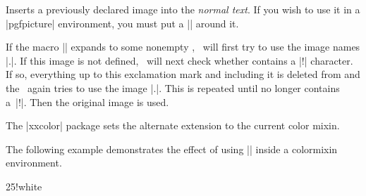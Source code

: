 \begin{command}{\pgfuseimage{}}
  Inserts a previously declared image into the \emph{normal text}. If
  you wish to use it in a |{pgfpicture}| environment, you must put a
  |\pgftext| around it.

  If the macro |\pgfalternateextension| expands to some nonempty
  , \pgfname\ will first try to use the image
  names |.|. If this
  image is not defined, \pgfname\ will next check whether  contains a |!| character. If so, everything up to this
  exclamation mark and including it is deleted from  and the \pgfname\ again tries to use the image |.|. This is repeated until
   no longer contains a~|!|. Then the
  original image is used.

  The |xxcolor| package sets the alternate extension to the current
  color mixin.          %

\begin{codeexample}[]
\begin{pgfpicture}

  \pgfpathrectangle{\pgfpoint{1cm}{5cm}}{\pgfpoint{1cm}{1cm}}
  \pgfpathrectangle{\pgfpoint{1cm}{3cm}}{\pgfpoint{1cm}{1cm}}
  \pgfpathrectangle{\pgfpoint{1cm}{1cm}}{\pgfpoint{1cm}{1cm}}
\end{pgfpicture}
\end{codeexample}

  The following example demonstrates the effect of using
  |\pgfuseimage| inside a colormixin environment.

\begin{codeexample}[]
\begin{colormixin}{25!white}
\begin{pgfpicture}


\end{pgfpicture}
\end{colormixin}
\end{codeexample}
\end{command}
